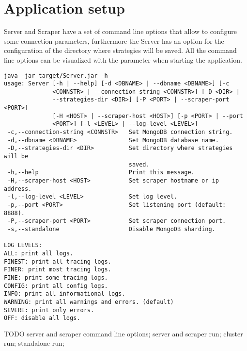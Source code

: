 \chapter{Application setup}\label{appendix:setup}

Server and Scraper have a set of command line options that allow to configure 
some connection parameters, furthermore the Server has an option for the
configuration of the directory where strategies will be saved. All the command
line options can be visualized with the  parameter when starting the
application.

\begin{verbatim}
java -jar target/Server.jar -h
usage: Server [-h | --help] [-d <DBNAME> | --dbname <DBNAME>] [-c
              <CONNSTR> | --connection-string <CONNSTR>] [-D <DIR> |
              --strategies-dir <DIR>] [-P <PORT> | --scraper-port <PORT>]
              [-H <HOST> | --scraper-host <HOST>] [-p <PORT> | --port
              <PORT>] [-l <LEVEL> | --log-level <LEVEL>]
 -c,--connection-string <CONNSTR>   Set MongoDB connection string.
 -d,--dbname <DBNAME>               Set MongoDB database name.
 -D,--strategies-dir <DIR>          Set directory where strategies will be
                                    saved.
 -h,--help                          Print this message.
 -H,--scraper-host <HOST>           Set scraper hostname or ip address.
 -l,--log-level <LEVEL>             Set log level.
 -p,--port <PORT>                   Set listening port (default: 8888).
 -P,--scraper-port <PORT>           Set scraper connection port.
 -s,--standalone                    Disable MongoDB sharding.

LOG LEVELS:
ALL: print all logs.
FINEST: print all tracing logs.
FINER: print most tracing logs.
FINE: print some tracing logs.
CONFIG: print all config logs.
INFO: print all informational logs.
WARNING: print all warnings and errors. (default)
SEVERE: print only errors.
OFF: disable all logs.
\end{verbatim}


TODO server and scraper command line options; server and scraper run; cluster
run; standalone run; 
